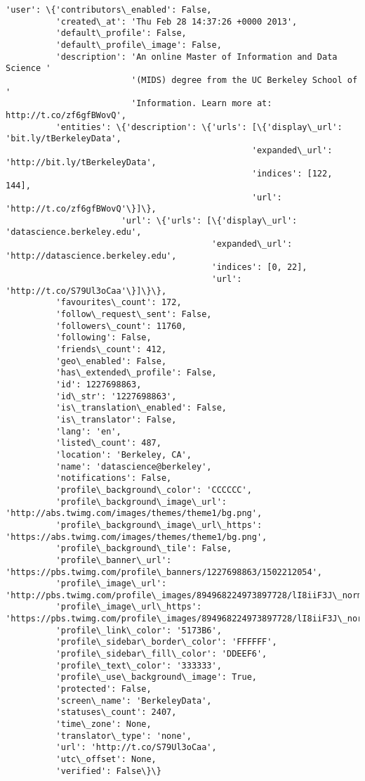 \documentclass[11pt]{article}
\begin{document}
\begin{Verbatim}[commandchars=\\\{\}]
 'user': \{'contributors\_enabled': False,
          'created\_at': 'Thu Feb 28 14:37:26 +0000 2013',
          'default\_profile': False,
          'default\_profile\_image': False,
          'description': 'An online Master of Information and Data Science '
                         '(MIDS) degree from the UC Berkeley School of '
                         'Information. Learn more at: http://t.co/zf6gfBWovQ',
          'entities': \{'description': \{'urls': [\{'display\_url': 'bit.ly/tBerkeleyData',
                                                 'expanded\_url': 'http://bit.ly/tBerkeleyData',
                                                 'indices': [122, 144],
                                                 'url': 'http://t.co/zf6gfBWovQ'\}]\},
                       'url': \{'urls': [\{'display\_url': 'datascience.berkeley.edu',
                                         'expanded\_url': 'http://datascience.berkeley.edu',
                                         'indices': [0, 22],
                                         'url': 'http://t.co/S79Ul3oCaa'\}]\}\},
          'favourites\_count': 172,
          'follow\_request\_sent': False,
          'followers\_count': 11760,
          'following': False,
          'friends\_count': 412,
          'geo\_enabled': False,
          'has\_extended\_profile': False,
          'id': 1227698863,
          'id\_str': '1227698863',
          'is\_translation\_enabled': False,
          'is\_translator': False,
          'lang': 'en',
          'listed\_count': 487,
          'location': 'Berkeley, CA',
          'name': 'datascience@berkeley',
          'notifications': False,
          'profile\_background\_color': 'CCCCCC',
          'profile\_background\_image\_url': 'http://abs.twimg.com/images/themes/theme1/bg.png',
          'profile\_background\_image\_url\_https': 'https://abs.twimg.com/images/themes/theme1/bg.png',
          'profile\_background\_tile': False,
          'profile\_banner\_url': 'https://pbs.twimg.com/profile\_banners/1227698863/1502212054',
          'profile\_image\_url': 'http://pbs.twimg.com/profile\_images/894968224973897728/lI8iiF3J\_normal.jpg',
          'profile\_image\_url\_https': 'https://pbs.twimg.com/profile\_images/894968224973897728/lI8iiF3J\_normal.jpg',
          'profile\_link\_color': '5173B6',
          'profile\_sidebar\_border\_color': 'FFFFFF',
          'profile\_sidebar\_fill\_color': 'DDEEF6',
          'profile\_text\_color': '333333',
          'profile\_use\_background\_image': True,
          'protected': False,
          'screen\_name': 'BerkeleyData',
          'statuses\_count': 2407,
          'time\_zone': None,
          'translator\_type': 'none',
          'url': 'http://t.co/S79Ul3oCaa',
          'utc\_offset': None,
          'verified': False\}\}

    \end{Verbatim}
\end{document}
